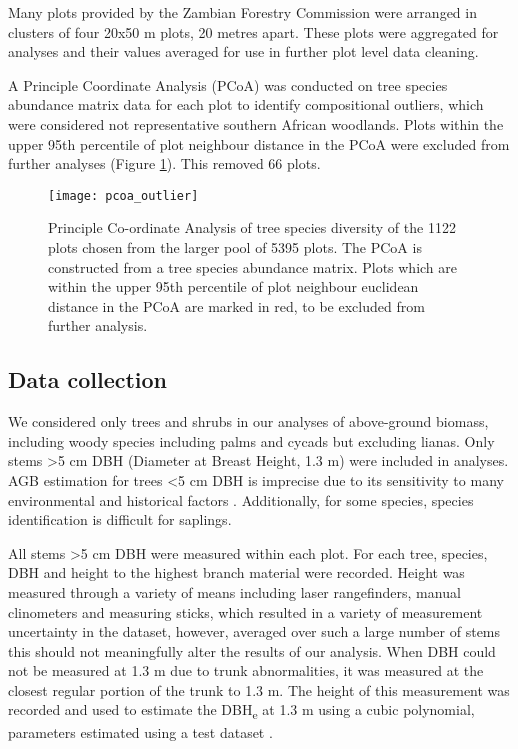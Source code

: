 \documentclass[11pt,a4paper]{article}
\begin{document}
Many plots provided by the Zambian Forestry Commission were arranged in clusters of four 20x50 m plots, 20 metres apart. These plots were aggregated for analyses and their values averaged for use in further plot level data cleaning.

A Principle Coordinate Analysis (PCoA) was conducted on tree species abundance matrix data for each plot to identify compositional outliers, which were considered not representative southern African woodlands. Plots within the upper 95th percentile of plot neighbour distance in the PCoA were excluded from further analyses (Figure \ref{pcoa_outlier}). This removed 66 plots.

\begin{figure}[H]
\centering
	\texttt{[image: pcoa\_outlier]}
	\caption{Principle Co-ordinate Analysis of tree species diversity of the 1122 plots chosen from the larger pool of 5395 plots. The PCoA is constructed from a tree species abundance matrix. Plots which are within the upper 95th percentile of plot neighbour euclidean distance in the PCoA are marked in red, to be excluded from further analysis.}
	\label{pcoa_outlier}
\end{figure}

\subsection{Data collection}

We considered only trees and shrubs in our analyses of above-ground biomass, including woody species including palms and cycads but excluding lianas. Only stems \textgreater{}5 cm DBH (Diameter at Breast Height, 1.3 m) were included in analyses. AGB estimation for trees \textless{}5 cm DBH is imprecise due to its sensitivity to many environmental and historical factors \citep{}. Additionally, for some species, species identification is difficult for saplings.

All stems \textgreater{}5 cm DBH were measured within each plot. For each tree, species, DBH and height to the highest branch material were recorded. Height was measured through a variety of means including laser rangefinders, manual clinometers and measuring sticks, which resulted in a variety of measurement uncertainty in the dataset, however, averaged over such a large number of stems this should not meaningfully alter the results of our analysis. When DBH could not be measured at 1.3 m due to trunk abnormalities, it was measured at the closest regular portion of the trunk to 1.3 m. The height of this measurement was recorded and used to estimate the DBH\textsubscript{e} at 1.3 m using a cubic polynomial, parameters estimated using a test dataset \citep{Ryanunbublished}.
\end{document}
